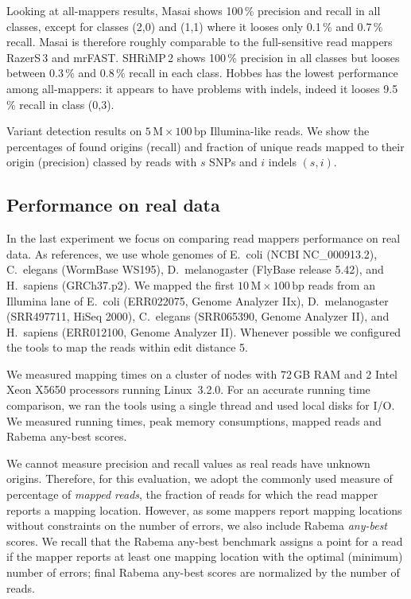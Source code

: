 Looking at all-mappers results, Masai shows 100\,\% precision and recall in all classes, except for classes (2,0) and (1,1) where it looses only 0.1\,\% and 0.7\,\% recall.
Masai is therefore roughly comparable to the full-sensitive read mappers RazerS\,3 and mrFAST.
SHRiMP\,2 shows 100\,\% precision in all classes but looses between 0.3\,\% and 0.8\,\% recall in each class.
Hobbes has the lowest performance among all-mappers: it appears to have problems with indels, indeed it looses 9.5\,\% recall in class (0,3).

\begin{table*}[tH!]
  \caption[Variant detection results]
  {
  \label{tab:Variant}
    Variant detection results on $5\,\text{M}\times 100\,\text{bp}$ Illumina-like reads.
    We show the percentages of found origins (recall) and fraction of unique reads mapped to their origin (precision) classed by reads with $s$ SNPs and $i$ indels $(s,i)$.
  }
  \vspace{-3mm}
  \center
  \sffamily
  \resizebox{0.8\textwidth}{!}
  {
	\renewcommand{\tabcolsep}{0.8ex}
	
  }
\end{table*}

\subsection{Performance on real data}

In the last experiment we focus on comparing read mappers performance on real data.
As references, we use whole genomes of E.~coli (NCBI NC\_000913.2), C.~elegans (WormBase WS195), D.~melanogaster (FlyBase release 5.42), and H.~sapiens (GRCh37.p2).
We mapped the first $10\,\text{M}\times 100\,\text{bp}$ reads from an Illumina lane of E.~coli (ERR022075, Genome Analyzer IIx), D.~melanogaster (SRR497711, HiSeq 2000), C.~elegans (SRR065390, Genome Analyzer II), and H.~sapiens (ERR012100, Genome Analyzer II).
Whenever possible we configured the tools to map the reads within edit distance 5.

We measured mapping times on a cluster of nodes with 72\,GB RAM and 2 Intel Xeon X5650 processors running Linux~3.2.0.
For an accurate running time comparison, we ran the tools using a single thread and used local disks for I/O.
We measured running times, peak memory consumptions, mapped reads and Rabema any-best scores.

We cannot measure precision and recall values as real reads have unknown origins.
Therefore, for this evaluation, we adopt the commonly used measure of percentage of \emph{mapped reads}, \ie the fraction of reads for which the read mapper reports a mapping location.
However, as some mappers report mapping locations without constraints on the number of errors, we also include Rabema \emph{any-best} scores.
We recall that the Rabema any-best benchmark assigns a point for a read if the mapper reports at least one mapping location with the optimal (minimum) number of errors;
final Rabema any-best scores are normalized by the number of reads.

